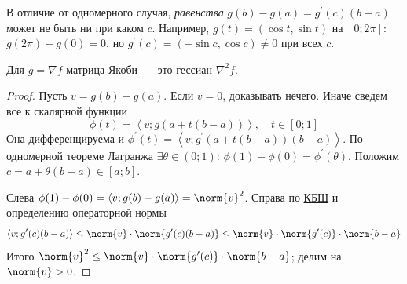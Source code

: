 

\begin{remark}
  В отличие от одномерного случая, \emph{равенства} $g(b) - g(a) = g^{\prime}(c)(b - a)$ может не быть ни при каком $c$. Например, $g(t) = (\cos t, \sin t)$ на $[0; 2\pi]$: $g(2\pi) - g(0) = 0$, но $g^{\prime}(c) = (-\sin c, \cos c) \ne 0$ при всех $c$.
\end{remark}

\begin{remark}
  Для $g = \nabla f$ матрица Якоби~--- это \hyperref[note:592AD816-1D80-48E6-8399-8524FBC1E8F3]{гессиан} $\nabla^2 f$.
\end{remark}

\begin{proof}
  Пусть $v = g(b) - g(a)$. Если $v = 0$, доказывать нечего. Иначе сведем все к скалярной функции
  \[
  \phi(t) = \left\langle v; g(a + t(b - a)) \right\rangle, \quad t \in [0;1]
  \]
  Она дифференцируема и $\phi^{\prime}(t) = \left\langle v; g^{\prime}(a + t(b-a))(b - a) \right\rangle$.
  По одномерной теореме Лагранжа $\exists \theta \in (0;1)$: $\phi(1) - \phi(0) = \phi^{\prime}(\theta)$. Положим $c = a + \theta(b - a) \in [a;b]$.

  Слева $\phi(1) - \phi(0) = \left\langle v; g(b) - g(a) \right\rangle = \norm{v}^2$. Справа по \hyperref[note:D0601ACD-8C91-4A93-B0E4-AC0D529C6A5C]{КБШ} и определению операторной нормы
  \[
  \left\langle v; g^{\prime}(c)(b - a) \right\rangle \le \norm{v} \cdot \norm{g^{\prime}(c)(b - a)} \le \norm{v} \cdot \norm{g^{\prime}(c)} \cdot \norm{b - a}
  \]
  Итого $\norm{v}^2 \le \norm{v} \cdot \norm{g^{\prime}(c)} \cdot \norm{b - a}$; делим на $\norm{v} > 0$.
\end{proof}
